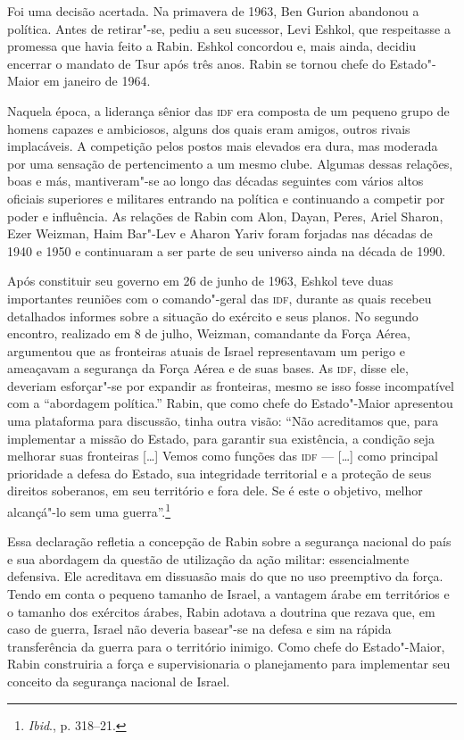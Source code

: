 Foi uma decisão acertada. Na primavera de 1963, Ben Gurion abandonou a
política. Antes de retirar"-se, pediu a seu sucessor, Levi Eshkol, que
respeitasse a promessa que havia feito a Rabin. Eshkol concordou e,
mais ainda, decidiu encerrar o mandato de Tsur após três anos.
Rabin se tornou chefe do Estado"-Maior em janeiro de 1964.

Naquela época, a liderança sênior das \textsc{idf} era composta de um pequeno
grupo de homens capazes e ambiciosos, alguns dos quais eram amigos,
outros rivais implacáveis. A competição pelos postos mais elevados era
dura, mas moderada por uma sensação de pertencimento a um mesmo clube.
Algumas dessas relações, boas e más, mantiveram"-se ao longo das décadas
seguintes com vários altos oficiais superiores e militares entrando na
política e continuando a competir por poder e influência. As relações de
Rabin com Alon, Dayan, Peres, Ariel Sharon, Ezer Weizman, Haim Bar"-Lev e
Aharon Yariv foram forjadas nas décadas de 1940 e 1950 e continuaram a
ser parte de seu universo ainda na década de 1990.

Após constituir seu governo em 26 de junho de 1963, Eshkol teve duas
importantes reuniões com o comando"-geral das \textsc{idf}, durante as quais
recebeu detalhados informes sobre a situação do exército e seus planos.
No segundo encontro, realizado em 8 de julho, Weizman, comandante da
Força Aérea, argumentou que as fronteiras atuais de Israel representavam
um perigo e ameaçavam a segurança da Força Aérea e de suas bases. As
\textsc{idf}, disse ele, deveriam esforçar"-se por expandir as fronteiras, mesmo
se isso fosse incompatível com a ``abordagem política.'' Rabin, que como
chefe do Estado"-Maior apresentou uma plataforma para discussão, tinha
outra visão: ``Não acreditamos que, para implementar a missão do Estado,
para garantir sua existência, a condição seja melhorar suas fronteiras
{[}\ldots{}{]} Vemos como funções das \textsc{idf} --- {[}\ldots{}{]} como principal prioridade a defesa do
Estado, sua integridade territorial e a proteção de seus direitos
soberanos, em seu território e fora dele. Se é este o objetivo, melhor
alcançá"-lo sem uma guerra''.\footnote{\emph{Ibid}., p. 318--21.}

Essa declaração refletia a concepção de Rabin sobre a segurança nacional do
país e sua abordagem da questão de utilização da ação militar:
essencialmente defensiva. Ele acreditava em dissuasão mais do que no uso
preemptivo da força. Tendo em conta o pequeno tamanho de Israel, a
vantagem árabe em territórios e o tamanho dos exércitos árabes, Rabin
adotava a doutrina que rezava que, em caso de guerra, Israel não deveria
basear"-se na defesa e sim na rápida transferência da guerra para o
território inimigo. Como chefe do Estado"-Maior, Rabin construiria a
força e supervisionaria o planejamento para implementar seu conceito da
segurança nacional de Israel.

